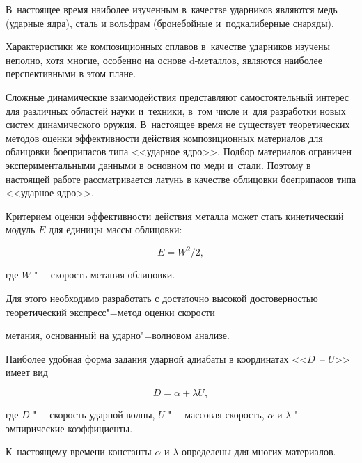 В~настоящее время наиболее изученным в~качестве ударников являются медь (ударные ядра), сталь и вольфрам (бронебойные и~подкалиберные снаряды). 

Характеристики же композиционных сплавов в~качестве ударников изучены неполно, хотя многие, особенно на основе d-металлов,  являются наиболее перспективными в этом плане.



Сложные динамические взаимодействия представляют самостоятельный интерес для различных областей науки и~техники, в~том числе и~для разработки новых систем динамического оружия. В~настоящее время не существует теоретических методов оценки эффективности действия композиционных материалов для облицовки боеприпасов типа <<ударное ядро>>. Подбор материалов ограничен экспериментальными данными в основном по меди и~стали. Поэтому в настоящей работе рассматривается латунь в качестве облицовки боеприпасов типа <<ударное ядро>>.



Критерием оценки эффективности действия металла может стать кинетический модуль $E$ для единицы массы облицовки:

\[

E=W^2/2,

\]

где $W$ "--- скорость метания облицовки.

Для этого необходимо разработать с достаточно высокой достоверностью теоретический экспресс"=метод оценки скорости

метания, основанный на ударно"=волновом анализе.



\smallskip




Наиболее удобная форма задания ударной адиабаты в  координатах <<$D$~-- $U$>> имеет вид

\begin{equation}

D=\alpha +\lambda U,

\label{reut2:eq1}

\end{equation}

где $D$ "--- скорость ударной волны, $U$ "--- массовая скорость, $\alpha $ и $\lambda $ "--- эмпирические коэффициенты. 

К~настоящему времени константы $\alpha $ и $\lambda $ определены для многих материалов. 

